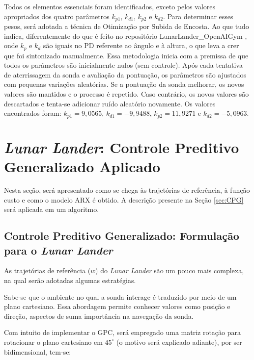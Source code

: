 \documentclass[12pt,           %
a4paper,                       %
openany,                       %
oneside,                       %
chapter=TITLE,                 %
english,                       %
spanish,                       %
brazil,                        %
sumario=tradicional]{abntex2}  %
\begin{document}
\begin{OnehalfSpace}
Todos os elementos essenciais foram identificados, exceto pelos valores apropriados dos quatro parâmetros $k_{p1}$, $k_{d1}$, $k_{p2}$ e $k_{d2}$. Para determinar esses pesos, será adotada a técnica de Otimização por Subida de Encosta. Ao que tudo indica, diferentemente do que é feito no repositório LunarLander\_OpenAIGym \cite{llpid}, onde $k_p$ e $k_d$ são iguais no PD referente ao ângulo e à altura, o que leva a crer que foi sintonizado manualmente. Essa metodologia inicia com a premissa de que todos os parâmetros são inicialmente nulos (sem controle). Após cada tentativa de aterrissagem da sonda e avaliação da pontuação, os parâmetros são ajustados com pequenas variações aleatórias. Se a pontuação da sonda melhorar, os novos valores são mantidos e o processo é repetido. Caso contrário, os novos valores são descartados e tenta-se adicionar ruído aleatório novamente. Os valores encontrados foram: $k_{p1} = 9,0565$, $k_{d1} = -9,9488$, $k_{p2} = 11,9271$ e $k_{d2} = -5,0963$. 

\section{\textit{Lunar Lander}: Controle Preditivo Generalizado Aplicado}
\label{sec:GPCfor}    

Nesta seção, será apresentado como se chega às trajetórias de referência, à função custo e como o modelo ARX é obtido. A descrição presente na Seção \ref{sec:CPG} será aplicada em um algoritmo.

\subsection{Controle Preditivo Generalizado: Formulação para o \textit{Lunar Lander}}
\label{subsec:GPCtr}   

As trajetórias de referência ($w$) do \textit{Lunar Lander} são um pouco mais complexa, na qual serão adotadas algumas estratégias. 

Sabe-se que o ambiente no qual a sonda interage é traduzido por meio de um plano cartesiano. Essa abordagem permite conhecer valores como posição e direção, aspectos de suma importância na navegação da sonda.

Com intuito de implementar o GPC, será empregado uma matriz rotação para rotacionar o plano cartesiano em $45^\circ$ (o motivo será explicado adiante), por ser bidimensional, tem-se:


\end{OnehalfSpace}
\end{document}
